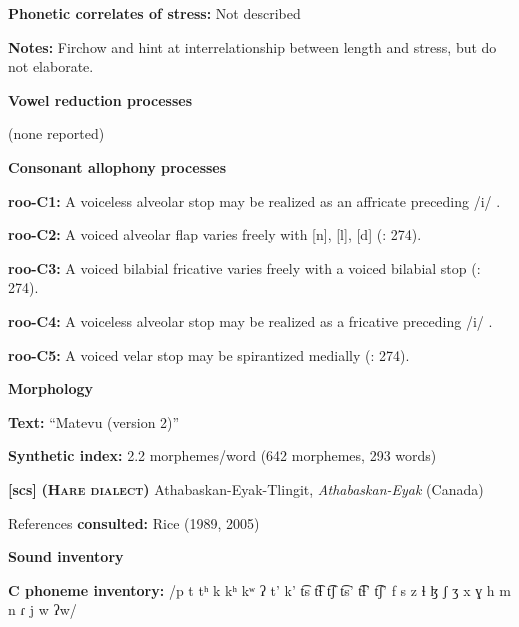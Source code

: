 \textbf{Phonetic correlates of stress:} Not described



\textbf{Notes:} Firchow and \citet[271]{Firchow1969} hint at interrelationship between length and stress, but do not elaborate.



\textbf{Vowel reduction processes}



(none reported)



\textbf{Consonant allophony processes}



\textbf{roo-C1:} A voiceless alveolar stop may be realized as an affricate preceding /i/ \citep[28]{Robinson2011}.



\textbf{roo-C2:} A voiced alveolar flap varies freely with [n], [l], [d] (\citealt{FirchowFirchow1969}: 274).



\textbf{roo-C3:} A voiced bilabial fricative varies freely with a voiced bilabial stop (\citealt{FirchowFirchow1969}: 274).



\textbf{roo-C4:} A voiceless alveolar stop may be realized as a fricative preceding /i/ \citep[28]{Robinson2011}.



\textbf{roo-C5:} A voiced velar stop may be spirantized medially (\citealt{FirchowFirchow1969}: 274).



\textbf{Morphology}



\textbf{Text:} “Matevu (version 2)” \citep[293-304]{Robinson2011}



\textbf{Synthetic index:} 2.2 morphemes/word (642 morphemes, 293 words)



\textbf{[scs]}   \textbf{\textsc{ (Hare dialect)}}  Athabaskan-Eyak-Tlingit, \textit{Athabaskan-Eyak} (Canada)



References \textbf{consulted:} Rice (1989, 2005)



\textbf{Sound inventory}



\textbf{C phoneme inventory:} /p t tʰ k kʰ kʷ ʔ t’ k’ t͡s t͡ɬ t͡ʃ t͡s’ t͡ɬ’ t͡ʃ’ f s z ɬ ɮ ʃ ʒ x ɣ h m n ɾ j w ʔw/



